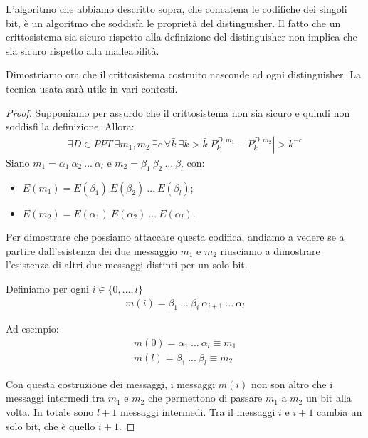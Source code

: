L'algoritmo che abbiamo descritto sopra, che concatena le codifiche dei singoli bit, è un algoritmo che soddisfa le proprietà del distinguisher. Il fatto che un crittosistema sia sicuro rispetto alla definizione del distinguisher non implica che sia sicuro rispetto alla malleabilità. 

Dimostriamo ora che il crittosistema costruito nasconde ad ogni distinguisher. La tecnica usata sarà utile in vari contesti.

\begin{proof}
Supponiamo per assurdo che il crittosistema non sia sicuro e quindi non soddisfi la definizione. Allora:
\begin{align*}
    \exists D \in PPT \ \exists m_1, m_2 \ \exists c \ \forall \bar{k} \ \exists{k > \bar{k}} \left| P_k^{D, m_1} - P_k^{D, m_2} \right| > k^{-c}
\end{align*}
Siano $m_1 = \alpha_1 \ \alpha_2 \ ... \ \alpha_l$ e $m_2 = \beta_1 \ \beta_2 \ ... \ \beta_l$ con:
\begin{itemize}
    \item $E(m_1) = E(\beta_1) \ E(\beta_2) \ ... \ E(\beta_l)$;
    \item $E(m_2) = E(\alpha_1) \ E(\alpha_2) \ ... \ E(\alpha_l)$.
\end{itemize}
\noindent Per dimostrare che possiamo attaccare questa codifica, andiamo a vedere se a partire dall'esistenza dei due messaggio $m_1$ e $m_2$ riusciamo a dimostrare l'esistenza di altri due messaggi distinti per un solo bit. 

Definiamo per ogni $i \in \{0, ..., l\}$
\begin{align*}
    m(i) = \beta_1 \ ... \ \beta_i \ \alpha_{i+1} \ ... \ \alpha_{l}
\end{align*}

\noindent Ad esempio:
\begin{align*}
    m(0) = \alpha_{1} \ ... \ \alpha_{l} \equiv m_1\\
    m(l) = \beta_1 \ ... \ \beta_l \equiv m_2
\end{align*}

\noindent Con questa costruzione dei messaggi, i messaggi $m(i)$ non son altro che i messaggi intermedi tra $m_1$ e $m_2$ che permettono di passare $m_1$ a $m_2$ un bit alla volta. In totale sono $l+1$ messaggi intermedi. Tra il messaggi $i$ e $i+1$ cambia un solo bit, che è quello $i+1$.


\end{proof}
